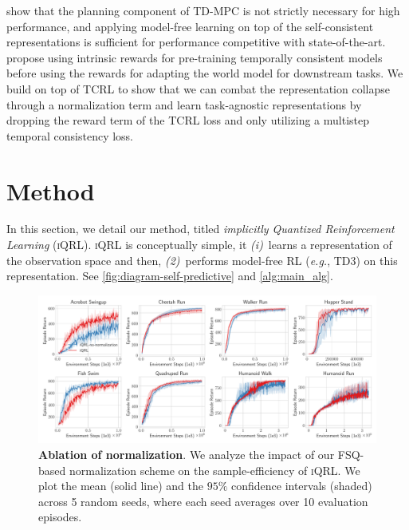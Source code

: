 \documentclass{article}
\makeatletter
\theoremstyle{plain}
\theoremstyle{definition}
\theoremstyle{remark}
\newcommand{\our}{\textsc{iQRL}\xspace}
\newcommand{\eg}{\textit{e.g.\@}\xspace}
\makeatother
\begin{document}
\citet{zhaoSimplifiedTemporalConsistency2023} show that the planning component of TD-MPC is not strictly necessary for high performance, and applying model-free learning on top of the self-consistent representations is sufficient for performance competitive with state-of-the-art. \citet{yuan2022euclid} propose using intrinsic rewards for pre-training temporally consistent models before using the rewards for adapting the world model for downstream tasks. We build on top of TCRL to show that we can combat the representation collapse through a normalization term and learn task-agnostic representations by dropping the reward term of the TCRL loss and only utilizing a multistep temporal consistency loss.


\section{Method}
\label{sec:method}

In this section, we detail our method, titled \textit{implicitly Quantized Reinforcement Learning} (\our).
\our is conceptually simple, it {\em (i)}~learns a representation of the observation space and then,
{\em (2)}~performs model-free RL (\eg, TD3) on this representation.
See \cref{fig:diagram-self-predictive} and \cref{alg:main_alg}.


\begin{figure}[ht]
\vskip 0.2in
\begin{center}
\centerline{\includegraphics[width=1.0\textwidth]{./figs/normalization-ablation.pdf}}
\caption{\textbf{Ablation of normalization}. We analyze the impact of our FSQ-based normalization scheme on the sample-efficiency of \our. We plot the mean (solid line) and the $95\%$ confidence intervals (shaded) across 5 random seeds, where each seed averages over 10 evaluation episodes.}
\label{fig:normalization-ablation}
\end{center}
\vskip -0.2in
\end{figure}
\end{document}
